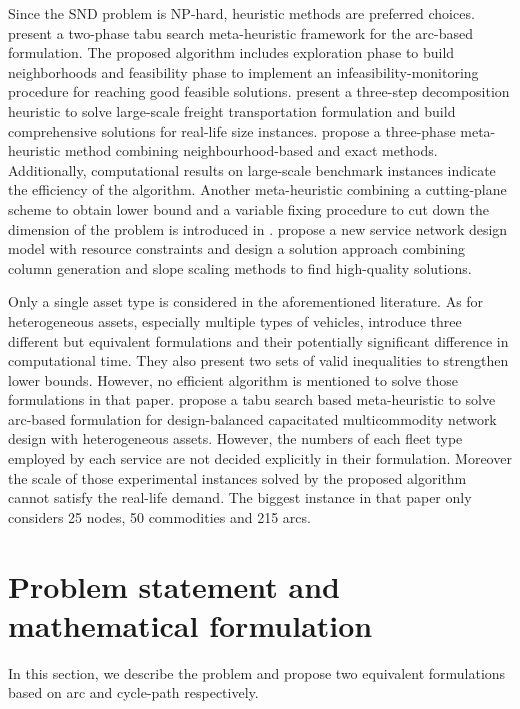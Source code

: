 \documentclass[11pt,nonblindrev,fleqn]{article}
\begin{document}
Since the SND problem is NP-hard, heuristic methods are preferred choices. \cite{Pedersen2009Models} present a two-phase tabu search meta-heuristic framework for the arc-based formulation. The proposed algorithm includes exploration phase to build neighborhoods and feasibility phase to implement an infeasibility-monitoring procedure for reaching good feasible solutions. \cite{Teypaz2010A} present a three-step decomposition heuristic to solve large-scale freight transportation formulation and build comprehensive solutions for real-life size instances. \cite{VuDucToulouse} propose a three-phase meta-heuristic method combining neighbourhood-based and exact methods. Additionally, computational results on large-scale benchmark instances indicate the efficiency of the algorithm. Another meta-heuristic combining a cutting-plane scheme to obtain lower bound and a variable fixing procedure to cut down the dimension of the problem is introduced in \cite{Chouman2015Cutting}. \cite{Crainic2016Service} propose a new service network design model with resource constraints and design a solution approach combining column generation and slope scaling methods to find high-quality solutions.

 Only a single asset type is considered in the aforementioned literature. As for heterogeneous assets, especially multiple types of vehicles, \cite{Kim1999Multimodal} introduce three different but equivalent formulations and their potentially significant difference in computational time. They also present two sets of valid inequalities to strengthen lower bounds. However, no efficient algorithm is mentioned to solve those formulations in that paper. \cite{li2017design} propose a tabu search based meta-heuristic to solve arc-based formulation for design-balanced capacitated multicommodity network design with heterogeneous assets. However, the numbers of each fleet type employed by each service are not decided explicitly in their formulation. Moreover the scale of those experimental instances solved by the proposed algorithm cannot satisfy the real-life demand. The biggest instance in that paper only considers 25 nodes, 50 commodities and 215 arcs.

\section{Problem statement and mathematical formulation}\label{formulation}
In this section, we describe the problem and propose two equivalent formulations based on arc and cycle-path respectively.
\end{document}
